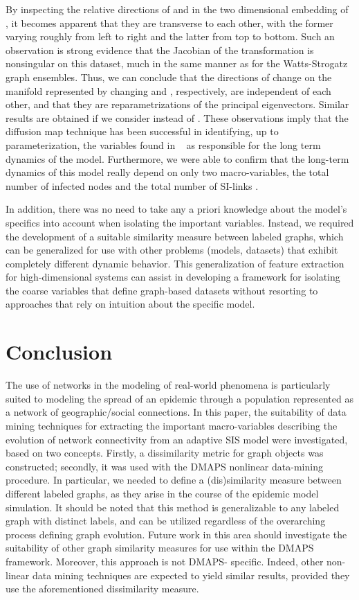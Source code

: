 By inspecting the relative directions of and in the two dimensional
embedding of , it becomes apparent that they are transverse to each
other, with the former varying roughly from left to right and the
latter from top to bottom. Such an observation is strong evidence that
the Jacobian of the transformation is nonsingular on this dataset,
much in the same manner as for the Watts-Strogatz graph
ensembles. Thus, we can conclude that the directions of change on the
manifold represented by changing and , respectively, are independent
of each other, and that they are reparametrizations of the principal
eigenvectors. Similar results are obtained if we consider instead of
. These observations imply that the diffusion map technique has been
successful in identifying, up to parameterization, the variables found
in ~\cite{gross_robust_2008} as responsible for the long term dynamics of the
model. Furthermore, we were able to confirm that the long-term
dynamics of this model really depend on only two macro-variables, the
total number of infected nodes and the total number of SI-links .

In addition, there was no need to take any a priori knowledge about
the model's specifics into account when isolating the important
variables. Instead, we required the development of a suitable
similarity measure between labeled graphs, which can be generalized
for use with other problems (models, datasets) that exhibit completely
different dynamic behavior. This generalization of feature extraction
for high-dimensional systems can assist in developing a framework for
isolating the coarse variables that define graph-based datasets
without resorting to approaches that rely on intuition about the
specific model.

\section{Conclusion}

The use of networks in the modeling of real-world phenomena is
particularly suited to modeling the spread of an epidemic through a
population represented as a network of geographic/social
connections. In this paper, the suitability of data mining techniques
for extracting the important macro-variables describing the evolution
of network connectivity from an adaptive SIS model were investigated,
based on two concepts. Firstly, a dissimilarity metric for graph
objects was constructed; secondly, it was used with the DMAPS
nonlinear data-mining procedure. In particular, we needed to define a
(dis)similarity measure between different labeled graphs, as they
arise in the course of the epidemic model simulation. It should be
noted that this method is generalizable to any labeled graph with
distinct labels, and can be utilized regardless of the overarching
process defining graph evolution. Future work in this area should
investigate the suitability of other graph similarity measures for use
within the DMAPS framework. Moreover, this approach is not DMAPS-
specific. Indeed, other non-linear data mining techniques are expected
to yield similar results, provided they use the aforementioned
dissimilarity measure.

